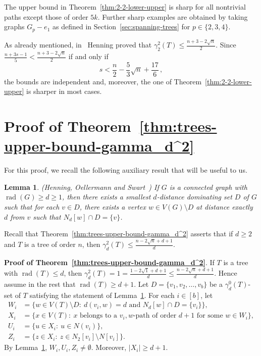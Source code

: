 \documentclass[12pt]{article}
\newtheorem{lemma}[theorem]{Lemma}
\newcommand{\mrho}{\gamma_2^2}
\DeclareMathOperator{\rad}{rad}
\begin{document}
\medskip
The upper bound in Theorem~\ref{thm:2-2-lower-upper} is sharp for all nontrivial paths except those of order $5k$. Further sharp examples are obtained by taking graphs $G_p-e_1$ as defined in Section~\ref{sec:spanning-trees} for $p \in \{2,3,4\}$.

As already mentioned, in~\cite{Henning-1998-1} Henning proved that $\mrho(T) \leq \frac{n+3-2\sqrt{n}}{2}$. Since $\frac{n+3s-1}{5} < \frac{n+3-2\sqrt{n}}{2}$ if and only if 
$$s < \frac{n}{2} - \frac{5}{3}\sqrt{n} + \frac{17}{6}\,,$$
the bounds are independent and, moreover, the one of Theorem~\ref{thm:2-2-lower-upper} is sharper in most cases.


\section{Proof of Theorem~\ref{thm:trees-upper-bound-gamma_d^2}}
\label{sec:proof3}

For this proof, we recall the following auxiliary result that will be useful to us. 
\begin{lemma} {\rm (Henning, Oellermann and Swart~\cite{Henning1995})}
    \label{lemma:d-distance-dominating-set}
If $G$ is a connected graph with $\rad(G) \ge d \ge 1$, then there exists a smallest $d$-distance dominating set $D$ of $G$ such that for each $v \in D$, there exists a vertex $w \in V(G) \setminus D$ at distance exactly $d$ from $v$ such that $N_d[w] \cap D=\{v\}$.
\end{lemma}

Recall that Theorem~\ref{thm:trees-upper-bound-gamma_d^2} asserts that if $d \geq 2$ and $T$ is a tree of order $n$, then $\gamma_d^2(T) \leq \frac{n-2\sqrt{n}+d+1}{d}$.

\medskip\noindent 
{\bf Proof of Theorem~\ref{thm:trees-upper-bound-gamma_d^2}}. 
    If $T$ is a tree with $\rad(T)\le d$, then $\gamma_d^2(T)=1 =\frac{1-2\sqrt{1}+d+1}{d} \leq \frac{n-2\sqrt{n}+d+1}{d}$. Hence assume in the rest that $\rad(T)\ge d+1$. Let $D=\{v_1,v_2,\dots,v_b\}$ be a $\gamma_d^0(T)$-set of $T$ satisfying the statement of Lemma~\ref{lemma:d-distance-dominating-set}. For each $i \in [b]$, let
    \begin{align*}
    W_i & =  \{w \in V(T) \setminus D:\ d(v_i,w)=d \text{~and~} N_d[w] \cap D =\{v_i\}\}, \\
    X_i & = \{x \in V(T):\ x \text{~belongs to a~} v_i,w\text{-path of order~} d+1 \text{~for some~} w \in W_i\}, \\
    U_i &  = \{u \in X_i:\ u \in N(v_i)\}, \\
    Z_i &  = \{z \in X_i:\ z \in N_2[v_i]\setminus N[v_i]\}.
\end{align*}	
    By Lemma~\ref{lemma:d-distance-dominating-set}, $W_i,U_i,Z_i \neq \emptyset$. Moreover, $|X_i| \geq d+1$.
	
\end{document}
